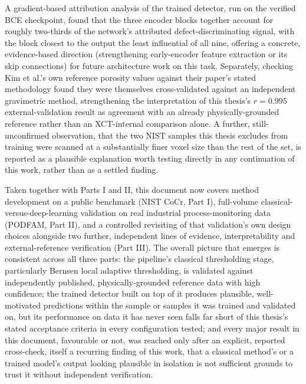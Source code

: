 A gradient-based attribution analysis of the trained detector, run on the verified BCE checkpoint,
found that the three encoder blocks together account for roughly two-thirds of the network's
attributed defect-discriminating signal, with the block closest to the output the least influential of
all nine, offering a concrete, evidence-based direction (strengthening early-encoder feature extraction
or its skip connections) for future architecture work on this task. Separately, checking Kim et al.'s
own reference porosity values against their paper's stated methodology found they were themselves
cross-validated against an independent gravimetric method, strengthening the interpretation of this
thesis's $r = 0.995$ external-validation result as agreement with an already physically-grounded
reference rather than an XCT-internal comparison alone. A further, still-unconfirmed observation, that
the two NIST samples this thesis excludes from training were scanned at a substantially finer voxel
size than the rest of the set, is reported as a plausible explanation worth testing directly in any
continuation of this work, rather than as a settled finding.

Taken together with Parts I and II, this document now covers method development on a public benchmark
(NIST CoCr, Part I), full-volume classical-versus-deep-learning validation on real industrial
process-monitoring data (PODFAM, Part II), and a controlled revisiting of that validation's own design
choices alongside two further, independent lines of evidence, interpretability and external-reference
verification (Part III). The overall picture that emerges is consistent across all three parts: the
pipeline's classical thresholding stage, particularly Bernsen local adaptive thresholding, is validated
against independently published, physically-grounded reference data with high confidence; the trained
detector built on top of it produces plausible, well-motivated predictions within the sample or samples
it was trained and validated on, but its performance on data it has never seen falls far short of this
thesis's stated acceptance criteria in every configuration tested; and every major result in this
document, favourable or not, was reached only after an explicit, reported cross-check, itself a
recurring finding of this work, that a classical method's or a trained model's output looking plausible
in isolation is not sufficient grounds to trust it without independent verification.
